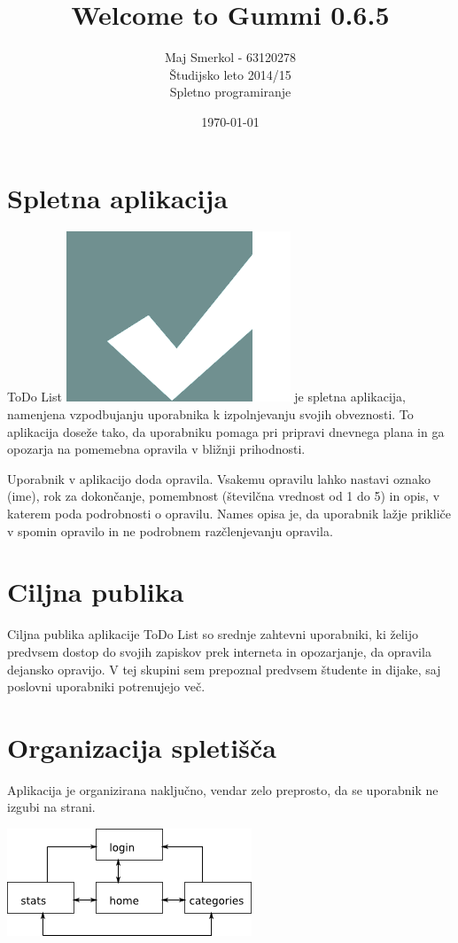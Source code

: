 \documentclass[12pt]{article}
\title{\textbf{Welcome to Gummi 0.6.5}}
\author{Maj Smerkol  - 63120278\\
Študijsko leto 2014/15 \\
Spletno programiranje}
\date{\today}
\begin{document}
\maketitle

\section{Spletna aplikacija}
ToDo List \includegraphics[scale=0.1]{todo_logo.png} je spletna aplikacija, namenjena vzpodbujanju uporabnika k izpolnjevanju svojih obveznosti. To aplikacija doseže tako, da uporabniku pomaga pri pripravi dnevnega plana in ga opozarja na pomemebna opravila v bližnji prihodnosti.

Uporabnik v aplikacijo doda opravila. Vsakemu opravilu lahko nastavi oznako (ime), rok za dokončanje, pomembnost (številčna vrednost od 1 do 5) in opis, v katerem poda podrobnosti o opravilu. Names opisa je, da uporabnik lažje prikliče v spomin opravilo in ne podrobnem razčlenjevanju opravila. 

\section{Ciljna publika}
Ciljna publika aplikacije ToDo List so srednje zahtevni uporabniki, ki želijo predvsem dostop do svojih zapiskov prek interneta in opozarjanje, da opravila dejansko opravijo. V tej skupini sem prepoznal predvsem študente in dijake, saj poslovni uporabniki potrenujejo več.

\newpage
\section{Organizacija spletišča}
Aplikacija je organizirana naključno, vendar zelo preprosto, da se uporabnik ne izgubi na strani.

\includegraphics[scale=1.4]{sitemap01.png}
\end{document}
